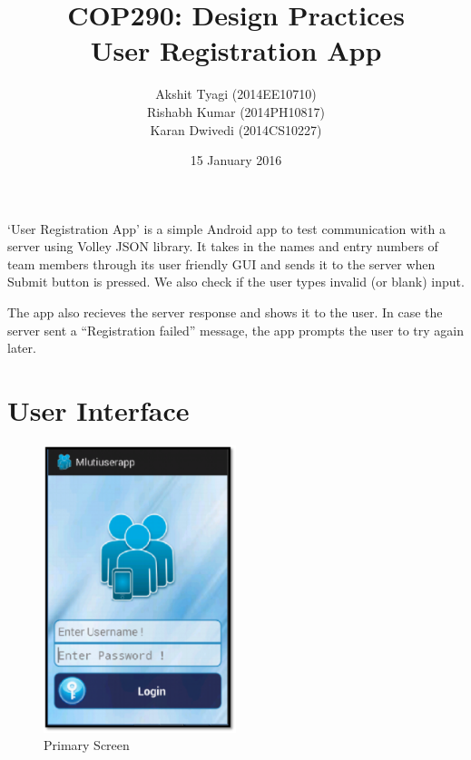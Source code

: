 \documentclass[12pt,a4paper,titlepage]{article}
\title{COP290: Design Practices\break\\User Registration App}
\author{Akshit Tyagi (2014EE10710) \\ Rishabh Kumar (2014PH10817) \\ Karan Dwivedi (2014CS10227) }
\date{15 January 2016}
\begin{document}
\maketitle

`User Registration App' is a simple Android app to test communication with a server using Volley JSON library. It takes in the names and entry numbers of team members through its user friendly GUI and sends it to the server when Submit button is pressed. We also check if the user types invalid (or blank) input.

The app also recieves the server response and shows it to the user. In case the server sent a ``Registration failed'' message, the app prompts the user to try again later.

\section{User Interface}

\begin{figure}[!ht]
	\centering
	\includegraphics[width=0.5\textwidth]{./UserInterface}
	\caption{Primary Screen}
\end{figure}
\end{document}
